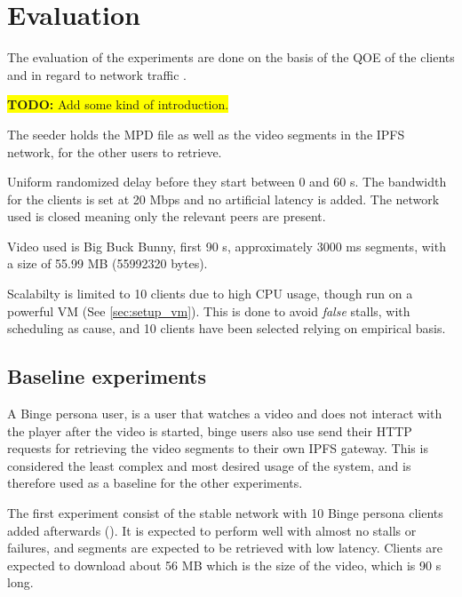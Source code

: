 \chapter{Evaluation}
\label{cha:evaluation}

The evaluation of the experiments are done on the basis of the \ac{QOE} of the clients and in regard to network traffic \cite{nguyen2009p2p}.

\colorbox{yellow}{\textbf{TODO:} Add some kind of introduction.}

The seeder holds the \ac{MPD} file as well as the video segments in the \ac{IPFS} network, for the other users to retrieve. 

Uniform randomized delay before they start between 0 and 60 \acs{s}.
The bandwidth for the clients is set at 20 \ac{Mbps} and no artificial latency is added.
The network used is closed meaning only the relevant peers are present.

Video used is Big Buck Bunny, first 90 \acs{s}, approximately 3000 \acs{ms} segments, with a size of 55.99 \acs{MB} (55992320 bytes).

Scalabilty is limited to 10 clients due to high CPU usage, though run on a powerful \ac{VM} (See \autoref{sec:setup_vm}). This is done to avoid \textit{false} stalls, with scheduling as cause, and 10 clients have been selected relying on empirical basis.  

\section{Baseline experiments}
\label{sec:eval_baseline}
A Binge persona user, is a user that watches a video and does not interact with the player after the video is started, binge users also use send their \ac{HTTP} requests for retrieving the video segments to their own \ac{IPFS} gateway. This is considered the least complex and most desired usage of the system, and is therefore used as a baseline for the other experiments.

The first experiment consist of the stable network with 10 Binge persona clients added afterwards  (). It is expected to perform well with almost no stalls or failures, and segments are expected to be retrieved with low latency. Clients are expected to download about 56 \ac{MB} which is the size of the video, which is 90 \acs{s} long.

